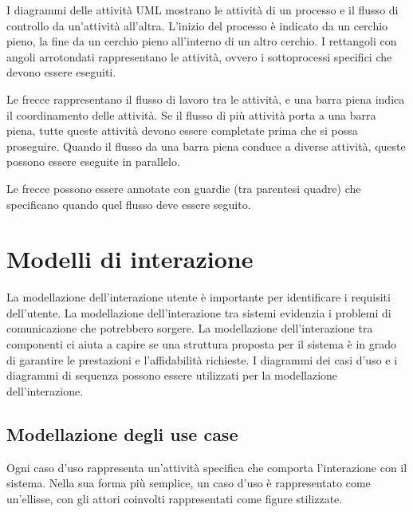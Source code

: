 I diagrammi delle attività UML mostrano le attività di un processo e il flusso di controllo da un'attività all'altra. L'inizio del processo è indicato da un cerchio pieno, la fine da un cerchio pieno all'interno di un altro cerchio. I rettangoli con angoli arrotondati rappresentano le attività, ovvero i sottoprocessi specifici che devono essere eseguiti.

Le frecce rappresentano il flusso di lavoro tra le attività, e una barra piena indica il coordinamento delle attività. Se il flusso di più attività porta a una barra piena, tutte queste attività devono essere completate prima che si possa proseguire. Quando il flusso da una barra piena conduce a diverse attività, queste possono essere eseguite in parallelo.

Le frecce possono essere annotate con guardie (tra parentesi quadre) che specificano quando quel flusso deve essere seguito.

\section{Modelli di interazione}
La modellazione dell'interazione utente è importante per identificare i requisiti dell'utente. La modellazione dell'interazione tra sistemi evidenzia i problemi di comunicazione che potrebbero sorgere. La modellazione dell'interazione tra componenti ci aiuta a capire se una struttura proposta per il sistema è in grado di garantire le prestazioni e l'affidabilità richieste. I  diagrammi dei casi d'uso e i diagrammi di sequenza possono essere utilizzati per la modellazione dell'interazione.

\subsection{Modellazione degli use case}
Ogni caso d'uso rappresenta un'attività specifica che comporta l'interazione con il sistema. Nella sua forma più semplice, un caso d'uso è rappresentato come un'ellisse, con gli attori coinvolti rappresentati come figure stilizzate.

